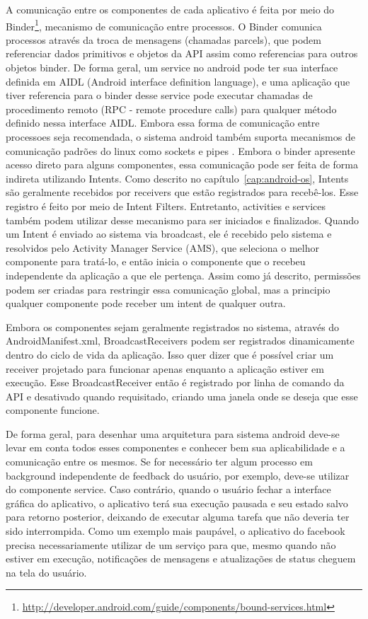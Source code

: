 A comunicação entre os componentes de cada aplicativo é feita por meio do Binder\footnote{\url{http://developer.android.com/guide/components/bound-services.html}}, mecanismo de comunicação entre processos. O Binder comunica processos através da troca de mensagens (chamadas parcels), que podem referenciar dados primitivos e objetos da API assim como referencias para outros objetos binder. De forma geral, um service no android pode ter sua interface definida em AIDL (Android interface definition language), e uma aplicação que tiver referencia para o binder desse service pode executar chamadas de procedimento remoto (RPC - remote procedure calls) para qualquer método definido nessa interface AIDL. Embora essa forma de comunicação entre processoes seja recomendada, o sistema android também suporta mecanismos de comunicação padrões do linux como sockets e pipes \cite{heuser2014}. Embora o binder apresente acesso direto para alguns componentes, essa comunicação pode ser feita de forma indireta utilizando Intents. Como descrito no capítulo~\ref{cap:android-os}, Intents são geralmente recebidos por receivers que estão registrados para recebê-los. Esse registro é feito por meio de Intent Filters. Entretanto, activities e services também podem utilizar desse mecanismo para ser iniciados e finalizados. Quando um Intent é enviado ao sistema via broadcast, ele é recebido pelo sistema e resolvidos pelo Activity Manager Service (AMS), que seleciona o melhor componente para tratá-lo, e então inicia o componente que o recebeu independente da aplicação a que ele pertença. Assim como já descrito, permissões podem ser criadas para restringir essa comunicação global, mas a principio qualquer componente pode receber um intent de qualquer outra. 

Embora os componentes sejam geralmente registrados no sistema, através do AndroidManifest.xml, BroadcastReceivers podem ser registrados dinamicamente dentro do ciclo de vida da aplicação. Isso quer dizer que é possível criar um receiver projetado para funcionar apenas enquanto a aplicação estiver em execução. Esse BroadcastReceiver então é registrado por linha de comando da API e desativado quando requisitado, criando uma janela onde se deseja que esse componente funcione.

De forma geral, para desenhar uma arquitetura para sistema android deve-se levar em conta todos esses componentes e conhecer bem sua aplicabilidade e a comunicação entre os mesmos. Se for necessário ter algum processo em background independente de feedback do usuário, por exemplo, deve-se utilizar do componente service. Caso contrário, quando o usuário fechar a interface gráfica do aplicativo, o aplicativo terá sua execução pausada e seu estado salvo para retorno posterior, deixando de executar alguma tarefa que não deveria ter sido interrompida. Como um exemplo mais paupável, o aplicativo do facebook precisa necessariamente utilizar de um serviço para que, mesmo quando não estiver em execução, notificações de mensagens e atualizações de status cheguem na tela do usuário.

